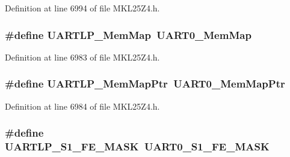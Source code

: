 Definition at line 6994 of file M\+K\+L25\+Z4.\+h.

\subsubsection[{\texorpdfstring{U\+A\+R\+T\+L\+P\+\_\+\+Mem\+Map}{UARTLP_MemMap}}]{\setlength{\rightskip}{0pt plus 5cm}\#define U\+A\+R\+T\+L\+P\+\_\+\+Mem\+Map~{\bf U\+A\+R\+T0\+\_\+\+Mem\+Map}}\hypertarget{group___backward___compatibility___symbols_ga92b653c99e40007d3c3339a79fa0e6a5}{}\label{group___backward___compatibility___symbols_ga92b653c99e40007d3c3339a79fa0e6a5}


Definition at line 6983 of file M\+K\+L25\+Z4.\+h.

\subsubsection[{\texorpdfstring{U\+A\+R\+T\+L\+P\+\_\+\+Mem\+Map\+Ptr}{UARTLP_MemMapPtr}}]{\setlength{\rightskip}{0pt plus 5cm}\#define U\+A\+R\+T\+L\+P\+\_\+\+Mem\+Map\+Ptr~{\bf U\+A\+R\+T0\+\_\+\+Mem\+Map\+Ptr}}\hypertarget{group___backward___compatibility___symbols_ga589ef759d83410b6f02bd68fcc3bf090}{}\label{group___backward___compatibility___symbols_ga589ef759d83410b6f02bd68fcc3bf090}


Definition at line 6984 of file M\+K\+L25\+Z4.\+h.

\subsubsection[{\texorpdfstring{U\+A\+R\+T\+L\+P\+\_\+\+S1\+\_\+\+F\+E\+\_\+\+M\+A\+SK}{UARTLP_S1_FE_MASK}}]{\setlength{\rightskip}{0pt plus 5cm}\#define U\+A\+R\+T\+L\+P\+\_\+\+S1\+\_\+\+F\+E\+\_\+\+M\+A\+SK~{\bf U\+A\+R\+T0\+\_\+\+S1\+\_\+\+F\+E\+\_\+\+M\+A\+SK}}\hypertarget{group___backward___compatibility___symbols_gada862f5e1e23eb050abaa6542986b29b}{}\label{group___backward___compatibility___symbols_gada862f5e1e23eb050abaa6542986b29b}


